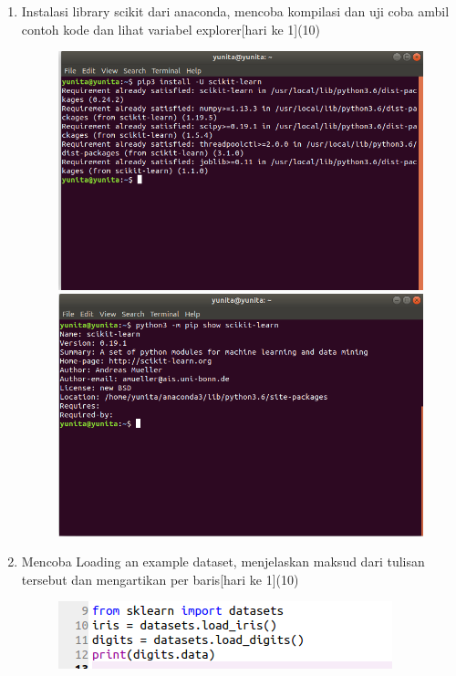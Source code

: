 \begin{enumerate}
\item
Instalasi library scikit dari anaconda, mencoba kompilasi dan uji coba ambil contoh kode dan lihat variabel explorer[hari ke 1](10)
\begin{figure}[!htbp]
		\centering
		\includegraphics[scale=0.4]{figures/1.PNG}
		\includegraphics[scale=0.5]{figures/2.PNG}
	\end{figure}
\newpage
\item
Mencoba Loading an example dataset, menjelaskan maksud dari tulisan tersebut dan mengartikan per baris[hari ke 1](10)
\begin{figure}[!htbp]
		\centering
		\includegraphics[scale=0.4]{figures/3.PNG}

\end{figure}
\end{enumerate}
